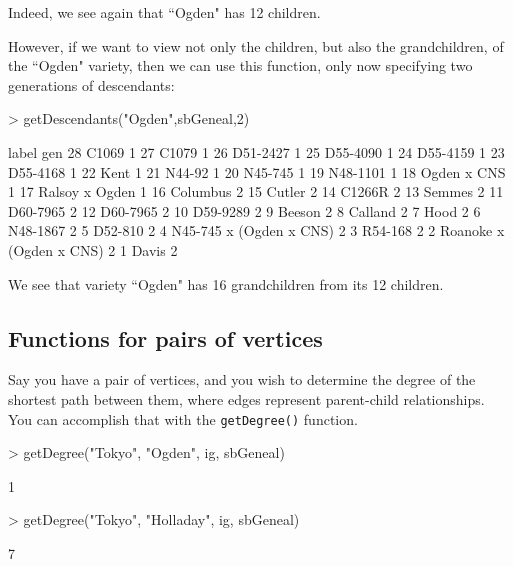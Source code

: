 \documentclass{article}
\numberwithin{equation}{section} %
\begin{document}
Indeed, we see again that ``Ogden" has 12 children. 

However, if we want to view not only the children, but also the grandchildren, of the ``Ogden" variety, then we can use this function, only now specifying two generations of descendants:

\begin{Schunk}
\begin{Sinput}
> getDescendants("Ogden",sbGeneal,2)
\end{Sinput}
\begin{Soutput}
                     label gen
28                   C1069   1
27                   C1079   1
26                D51-2427   1
25                D55-4090   1
24                D55-4159   1
23                D55-4168   1
22                    Kent   1
21                  N44-92   1
20                 N45-745   1
19                N48-1101   1
18             Ogden x CNS   1
17          Ralsoy x Ogden   1
16                Columbus   2
15                  Cutler   2
14                  C1266R   2
13                  Semmes   2
11                D60-7965   2
12                D60-7965   2
10                D59-9289   2
9                   Beeson   2
8                  Calland   2
7                     Hood   2
6                 N48-1867   2
5                  D52-810   2
4  N45-745 x (Ogden x CNS)   2
3                  R54-168   2
2  Roanoke x (Ogden x CNS)   2
1                    Davis   2
\end{Soutput}
\end{Schunk}

We see that variety ``Ogden" has 16 grandchildren from its 12 children.

\subsection{Functions for pairs of vertices}

Say you have a pair of vertices, and you wish to determine the degree of the shortest path between them, where edges represent parent-child relationships. You can accomplish that with the \texttt{getDegree()} function.

\begin{Schunk}
\begin{Sinput}
> getDegree("Tokyo", "Ogden", ig, sbGeneal)
\end{Sinput}
\begin{Soutput}
[1] 1
\end{Soutput}
\begin{Sinput}
> getDegree("Tokyo", "Holladay", ig, sbGeneal)
\end{Sinput}
\begin{Soutput}
[1] 7
\end{Soutput}
\end{Schunk}
\end{document}

